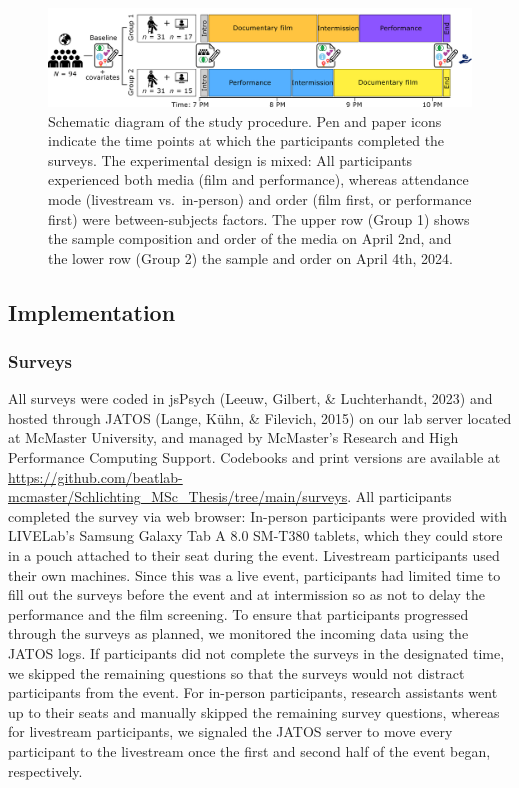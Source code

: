 \documentclass[
  man,floatsintext]{apa6}
\begin{document}
\begin{figure}
\includegraphics[width=1\linewidth]{images/Innocents_Diagram_StudyDesign} \caption{Schematic diagram of the study procedure. Pen and paper icons indicate the time points at which the participants completed the surveys. The experimental design is mixed: All participants experienced both media (film and performance), whereas attendance mode (livestream vs.~in-person) and order (film first, or performance first) were between-subjects factors. The upper row (Group 1) shows the sample composition and order of the media on April 2nd, and the lower row (Group 2) the sample and order on April 4th, 2024.}\label{fig:study-design}
\end{figure}

\subsection{Implementation}\label{implementation}

\subsubsection{Surveys}\label{surveys}

All surveys were coded in jsPsych (Leeuw, Gilbert, \& Luchterhandt, 2023) and hosted through JATOS (Lange, Kühn, \& Filevich, 2015) on our lab server located at McMaster University, and managed by McMaster's Research and High Performance Computing Support. Codebooks and print versions are available at \url{https://github.com/beatlab-mcmaster/Schlichting_MSc_Thesis/tree/main/surveys}. All participants completed the survey via web browser: In-person participants were provided with LIVELab's Samsung Galaxy Tab A 8.0 SM-T380 tablets, which they could store in a pouch attached to their seat during the event. Livestream participants used their own machines. Since this was a live event, participants had limited time to fill out the surveys before the event and at intermission so as not to delay the performance and the film screening. To ensure that participants progressed through the surveys as planned, we monitored the incoming data using the JATOS logs. If participants did not complete the surveys in the designated time, we skipped the remaining questions so that the surveys would not distract participants from the event. For in-person participants, research assistants went up to their seats and manually skipped the remaining survey questions, whereas for livestream participants, we signaled the JATOS server to move every participant to the livestream once the first and second half of the event began, respectively.
\end{document}
